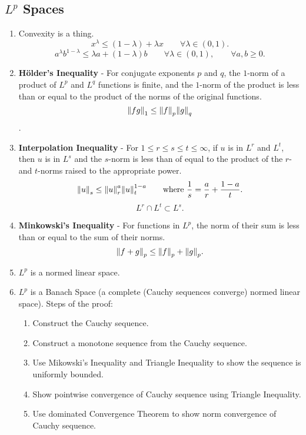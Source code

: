\documentclass{article}
\begin{document}
    \subsection{$L^p$ Spaces}
    \begin{enumerate}
        \item
            Convexity is a thing.  $$x^\lambda \leq (1 - \lambda) + \lambda x \qquad \forall \lambda \in (0,1).$$ $$a^\lambda b^{1-\lambda} \leq \lambda a + (1 - \lambda)b \qquad \forall \lambda \in (0,1), \qquad \forall a,b \geq 0.$$
        \item
            \textbf{H\"{o}lder's Inequality} - For conjugate exponents $p$ and $q$, the $1$-norm of a product of $L^p$ and $L^q$ functions is finite, and the $1$-norm of the product is less than or equal to the product of the norms of the original functions.  $$\norm{fg}_1 \leq \norm{f}_p\norm{g}_q$$.
        \item
            \textbf{Interpolation Inequality} - For $1 \leq r \leq s \leq t \leq \infty$, if $u$ is in $L^r$ and $L^t$, then $u$ is in $L^s$ and the $s$-norm is less than of equal to the product of the $r$- and $t$-norms raised to the appropriate power. $$\norm{u}_s \leq \norm{u}_r^a \norm{u}_t^{1-a}\qquad \text{where } \frac{1}{s} = \frac{a}{r} + \frac{1-a}{t}.$$ $$L^r \cap L^t \subset L^s.$$
        \item
            \textbf{Minkowski's Inequality} - For functions in $L^p$, the norm of their sum is less than or equal to the sum of their norms. $$\norm{f + g}_p \leq \norm{f}_p + \norm{g}_p.$$
        \item
            $L^p$ is a normed linear space.
        \item
            $L^p$ is a Banach Space (a complete (Cauchy sequences converge) normed linear space).  Steps of the proof:
            \begin{enumerate}
                \item
                    Construct the Cauchy sequence.
                \item
                    Construct a monotone sequence from the Cauchy sequence.
                \item
                    Use Mikowski's Inequality and Triangle Inequality to  show the sequence is uniformly bounded.
                \item
                    Show pointwise convergence of Cauchy sequence using Triangle Inequality.
                \item
                    Use dominated Convergence Theorem to show norm convergence of Cauchy sequence.

\end{enumerate}
\end{enumerate}
\end{document}
